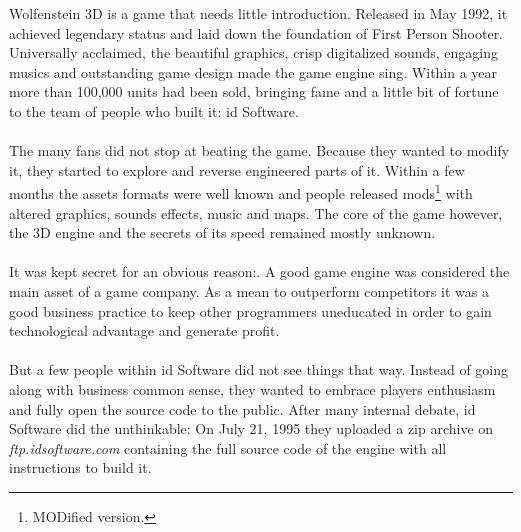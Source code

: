 Wolfenstein 3D is a game that needs little introduction. Released in May 1992, it achieved legendary status and laid down the foundation of First Person Shooter. Universally acclaimed, the beautiful graphics, crisp digitalized sounds, engaging musics and outstanding game design made the game engine sing. Within a year more than 100,000 units had been sold, bringing fame and a little bit of fortune to the team of people who built it: id Software.\\
\\
The many fans did not stop at beating the game. Because they wanted to modify it, they started to explore and reverse engineered parts of it. Within a few months the assets formats were well known and people released mods\footnote{MODified version.} with altered graphics, sounds effects, music and maps. The core of the game however, the 3D engine and the secrets of its speed remained mostly unknown.\\
\\
It was kept secret for an obvious reason:. A good game engine was considered the main asset of a game company. As a mean to outperform competitors it was a good business practice to keep other programmers  uneducated in order to gain technological advantage and generate profit.\\
\\
But a few people within id Software did not see things that way. Instead of going along with business common sense, they wanted to embrace players enthusiasm and fully open the source code to the public. After many internal debate, id Software did the unthinkable: On July 21, 1995 they uploaded a zip archive on \emph{ftp.idsoftware.com} containing the full source code of the engine with all instructions to build it.\\

